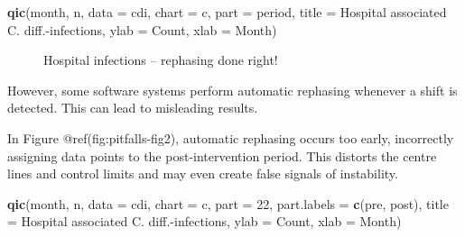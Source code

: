 \documentclass[
]{book}
\makeatletter
\newenvironment{Shaded}{\begin{snugshade}}{\end{snugshade}}
\newcommand{\AttributeTok}[1]{\textcolor[rgb]{0.13,0.29,0.53}{#1}}
\newcommand{\DecValTok}[1]{\textcolor[rgb]{0.00,0.00,0.81}{#1}}
\newcommand{\FunctionTok}[1]{\textcolor[rgb]{0.13,0.29,0.53}{\textbf{#1}}}
\newcommand{\NormalTok}[1]{#1}
\newcommand{\StringTok}[1]{\textcolor[rgb]{0.31,0.60,0.02}{#1}}
\newcommand*\pandocbounded[1]{%
  \sbox\pandoc@box{#1}%
  \Gscale@div\@tempa{\textheight}{\dimexpr\ht\pandoc@box+\dp\pandoc@box\relax}%
  \Gscale@div\@tempb{\linewidth}{\wd\pandoc@box}%
  \ifdim\@tempb\p@<\@tempa\p@\let\@tempa\@tempb\fi%
  \ifdim\@tempa\p@<\p@\scalebox{\@tempa}{\usebox\pandoc@box}%
  \else\usebox{\pandoc@box}%
  \fi%
}
\makeatother
\begin{document}
\begin{Shaded}
\begin{Highlighting}[]
\FunctionTok{qic}\NormalTok{(month, n,}
    \AttributeTok{data  =}\NormalTok{ cdi,}
    \AttributeTok{chart =} \StringTok{\textquotesingle{}c\textquotesingle{}}\NormalTok{,}
    \AttributeTok{part  =}\NormalTok{ period,}
    \AttributeTok{title =} \StringTok{\textquotesingle{}Hospital associated C. diff.{-}infections\textquotesingle{}}\NormalTok{,}
    \AttributeTok{ylab  =} \StringTok{\textquotesingle{}Count\textquotesingle{}}\NormalTok{,}
    \AttributeTok{xlab  =} \StringTok{\textquotesingle{}Month\textquotesingle{}}\NormalTok{)}
\end{Highlighting}
\end{Shaded}

\begin{figure}
\centering
\pandocbounded{}
\caption{Hospital infections -- rephasing done right!}
\end{figure}

However, some software systems perform automatic rephasing whenever a
shift is detected. This can lead to misleading results.

In Figure @ref(fig:pitfalls-fig2), automatic rephasing occurs too early,
incorrectly assigning data points to the post-intervention period. This
distorts the centre lines and control limits and may even create false
signals of instability.

\begin{Shaded}
\begin{Highlighting}[]
\FunctionTok{qic}\NormalTok{(month, n,}
    \AttributeTok{data        =}\NormalTok{ cdi,}
    \AttributeTok{chart       =} \StringTok{\textquotesingle{}c\textquotesingle{}}\NormalTok{,}
    \AttributeTok{part        =} \DecValTok{22}\NormalTok{,}
    \AttributeTok{part.labels =} \FunctionTok{c}\NormalTok{(}\StringTok{\textquotesingle{}pre\textquotesingle{}}\NormalTok{, }\StringTok{\textquotesingle{}post\textquotesingle{}}\NormalTok{),}
    \AttributeTok{title       =} \StringTok{\textquotesingle{}Hospital associated C. diff.{-}infections\textquotesingle{}}\NormalTok{,}
    \AttributeTok{ylab        =} \StringTok{\textquotesingle{}Count\textquotesingle{}}\NormalTok{,}
    \AttributeTok{xlab        =} \StringTok{\textquotesingle{}Month\textquotesingle{}}\NormalTok{)}
\end{Highlighting}
\end{Shaded}
\end{document}

